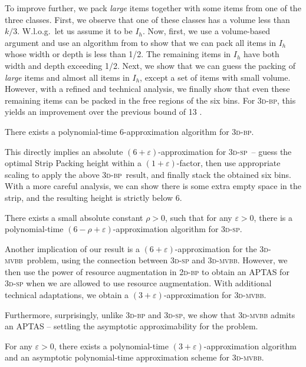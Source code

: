 \documentclass[a4paper,UKenglish,cleveref, autoref, thm-restate]{lipics-v2021}
\newcommand{\eps}{\varepsilon}
\newcommand{\twobp}{\textsc{2d-bp}\xspace}
\newcommand{\tbp}{\textsc{3d-bp}\xspace}
\newcommand{\tsp}{\textsc{3d-sp}\xspace}
\newcommand{\tmvc}{\textsc{3d-mvbb}\xspace}
\begin{document}
To improve further, we pack {\em large} items together with some items from one of the three classes. First, we observe that one of these classes has a volume less than $k/3$. W.l.o.g.~let us assume it to be  $I_h$. Now, first, we use a volume-based argument and use an algorithm from  \cite{li-cheng} to show that we can pack all items in $I_h$ whose width or depth is less than 1/2. The remaining items in $I_h$ have both width and depth exceeding 1/2. Next, we show that we can guess the packing of {\em large} items and almost all items in $I_h$, except a set of items with small volume. However, with a refined and technical analysis, we finally show that even these remaining items can be packed in the free regions of the six bins. For \tbp, this yields an improvement over the previous bound of 13 \cite{li-cheng}.

\begin{theorem}
\label{thm:3dbpabsolute}
    There exists a polynomial-time 6-approximation algorithm for \tbp.
\end{theorem}

This directly implies an absolute $(6+\eps)$-approximation for \tsp~-- guess the optimal Strip Packing height within a $(1+\eps)$-factor, then use appropriate scaling to apply the above \tbp~result, and finally stack the obtained six bins. 
With a more careful analysis, we can show there is some extra empty space in the strip, and the resulting height is strictly below 6. 


\begin{theorem}
\label{thm:spabsolute}
    There exists a small absolute constant $\rho>0$, such that for any $\varepsilon>0$, there is a polynomial-time $(6-\rho + \varepsilon)$-approximation algorithm for \textsc{3d-sp}.
\end{theorem}

Another implication of our result is a $(6+\eps)$-approximation for the \tmvc~problem, using the connection between \tsp and \tmvc \cite{alt2018approximating}. 
However, we then use the power of resource augmentation in \twobp to obtain an APTAS for \tsp when we are allowed to use resource augmentation. With additional technical adaptations, we obtain a $(3+\eps)$-approximation for \tmvc.



Furthermore, surprisingly, unlike \tbp and \tsp, we show that \tmvc admits an APTAS -- settling the asymptotic approximability for the problem. 

\begin{theorem}
\label{thm:mvbb}
    For any $\varepsilon > 0$, there exists a polynomial-time $(3+\varepsilon)$-approximation algorithm and an asymptotic polynomial-time approximation scheme for \tmvc.
\end{theorem}
\end{document}

